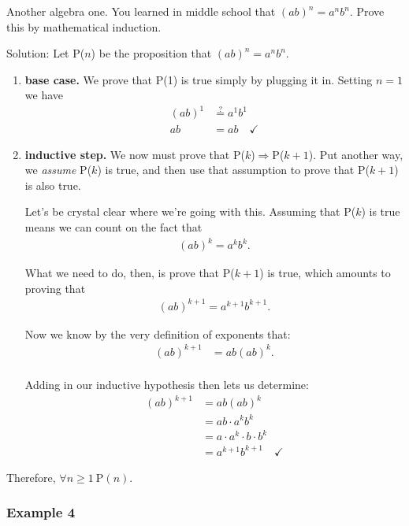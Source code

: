 Another algebra one. You learned in middle school that $(ab)^n=a^n b^n$.
Prove this by mathematical induction.

Solution: Let P($n$) be the proposition that $(ab)^n=a^n b^n$. 

\begin{enumerate}
\item \textbf{base case.} We prove that P(1) is true simply by plugging it
in. Setting $n=1$ we have
\begin{align*}
(ab)^1 & \stackrel{?}{=} a^1 b^1 \\
ab &= ab \quad \checkmark
\end{align*}

\item \textbf{inductive step.}
We now must prove that P($k$)$\Rightarrow$P($k+1$). Put another way, we
\textit{assume} P($k$) is true, and then use that assumption to prove that
P($k+1$) is also true.

Let's be crystal clear where we're going with this. Assuming that P($k$) is
true means we can count on the fact that
\begin{align*}
(ab)^k = a^k b^k.
\end{align*}

What we need to do, then, is prove that P($k+1$) is true, which amounts to
proving that
\begin{align*}
(ab)^{k+1} = a^{k+1} b^{k+1}.
\end{align*}

Now we know by the very definition of exponents that:
\begin{align*}
(ab)^{k+1} &= ab(ab)^k. \\
\end{align*}

Adding in our inductive hypothesis then lets us determine:
\begin{align*}
(ab)^{k+1} &= ab(ab)^k \\
&= ab \cdot a^k b^k \\
&= a \cdot a^k \cdot b \cdot b^k \\
&= a^{k+1} b^{k+1} \quad \checkmark
\end{align*}
\end{enumerate}

Therefore, $\forall n\geq1 \ \text{P}(n)$.


\subsubsection{Example 4}

